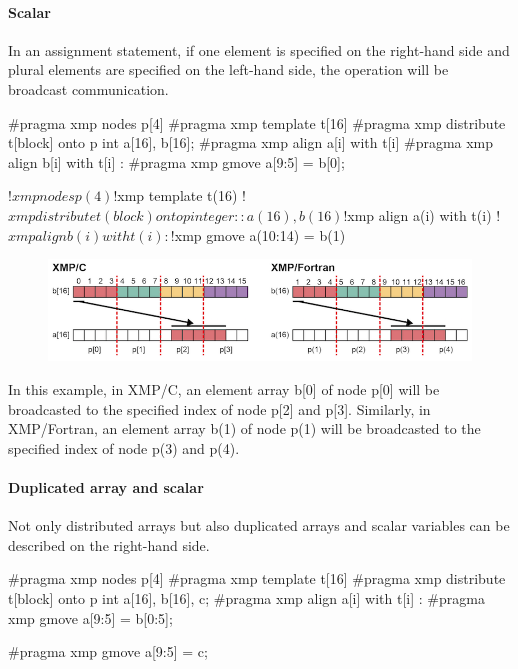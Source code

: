 \paragraph{Scalar}

In an assignment statement, if one element is specified on the
right-hand side and plural elements are specified on the left-hand side,
the operation will be broadcast communication.

\begin{XCexample}
#pragma xmp nodes p[4]
#pragma xmp template t[16]
#pragma xmp distribute t[block] onto p
int a[16], b[16];
#pragma xmp align a[i] with t[i]
#pragma xmp align b[i] with t[i]
     :
#pragma xmp gmove
  a[9:5] = b[0];
\end{XCexample}

\begin{XFexample}
!$xmp nodes p(4)
!$xmp template t(16)
!$xmp distribute t(block) onto p
integer :: a(16), b(16)
!$xmp align a(i) with t(i)
!$xmp align b(i) with t(i)
     :
!$xmp gmove
  a(10:14) = b(1)
\end{XFexample}

\begin{figure}
  \centering
  \includegraphics{figs/gmove_one_element.png}
\end{figure}

In this example, in XMP/C, an element array b[0] of node p[0] will be
broadcasted to the specified index of node p[2] and p[3]. Similarly, in
XMP/Fortran, an element array b(1) of node p(1) will be broadcasted to
the specified index of node p(3) and p(4).

\paragraph{Duplicated array and scalar}

Not only distributed arrays but also duplicated arrays and scalar
variables can be described on the right-hand side.

\begin{XCexample}
 #pragma xmp nodes p[4]
 #pragma xmp template t[16]
 #pragma xmp distribute t[block] onto p
 int a[16], b[16], c;
 #pragma xmp align a[i] with t[i]
      :
#pragma xmp gmove
   a[9:5] = b[0:5];

#pragma xmp gmove
   a[9:5] = c;
\end{XCexample}

